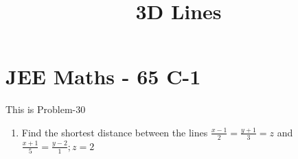 \documentclass[12pt]{article}
\begin{document}
\begin{center}
\title{\textbf{3D Lines}}
\date{\vspace{-5ex}} %
\maketitle
\end{center}
\setcounter{page}{1}

\section{JEE Maths - 65 C-1}
This is Problem-30 
\begin{enumerate}
\item Find the shortest distance between the lines $\frac{x-1}{2} = \frac{y+1}{3}=z$ and $\frac{x+1}{5} = \frac{y-2}{1}; z=2 $ 


\end{enumerate}
\end{document}
